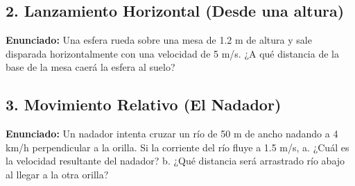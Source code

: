\documentclass[12pt, letterpaper]{article}
\begin{document}
	
	\subsection*{2. Lanzamiento Horizontal (Desde una altura)}
	\noindent \textbf{Enunciado:} Una esfera rueda sobre una mesa de 1.2 m de altura y sale disparada horizontalmente con una velocidad de 5 m/s. ¿A qué distancia de la base de la mesa caerá la esfera al suelo?
	
	
	\subsection*{3. Movimiento Relativo (El Nadador)}
	\noindent \textbf{Enunciado:} Un nadador intenta cruzar un río de 50 m de ancho nadando a 4 km/h perpendicular a la orilla. Si la corriente del río fluye a 1.5 m/s, a. ¿Cuál es la velocidad resultante del nadador? b. ¿Qué distancia será arrastrado río abajo al llegar a la otra orilla?
	
\end{document}
